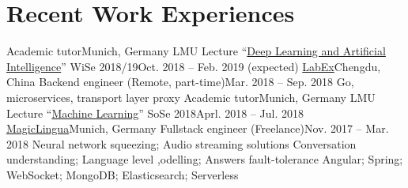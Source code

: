 \section{\textbf{Recent Work Experiences}}
  \resumeSubHeadingListStart
    \resumeSubheading
      {Academic tutor}{Munich, Germany}
      {LMU Lecture ``\href{http://www.dbs.ifi.lmu.de/cms/studium_lehre/lehre_master/deep1819/index.html}{Deep Learning and Artificial Intelligence}'' WiSe 2018/19}{Oct. 2018 -- Feb. 2019 (expected)}
      \resumeItemListStart
      \resumeItemListEnd
    \resumeSubheading
      {\href{https://labex.io/}{LabEx}}{Chengdu, China}
      {Backend engineer (Remote, part-time)}{Mar. 2018 -- Sep. 2018}
      \resumeItemListStart
          {Go, microservices, transport layer proxy}
      \resumeItemListEnd
    \resumeSubheading
      {Academic tutor}{Munich, Germany}
      {LMU Lecture ``\href{http://www.dbs.ifi.lmu.de/cms/studium_lehre/lehre_master/ml18/index.html}{Machine Learning}'' SoSe 2018}{Aprl. 2018 -- Jul. 2018}
      \resumeItemListStart
      \resumeItemListEnd
    \resumeSubheading
    {\href{https://magiclingua.com/}{MagicLingua}}{Munich, Germany}
    {Fullstack engineer (Freelance)}{Nov. 2017 -- Mar. 2018}
    \resumeItemListStart
        {Neural network squeezing; Audio streaming solutions}
        {Conversation understanding; Language level ,odelling; Answers fault-tolerance}
        {Angular; Spring; WebSocket; MongoDB; Elasticsearch; Serverless}
    \resumeItemListEnd
  \resumeSubHeadingListEnd